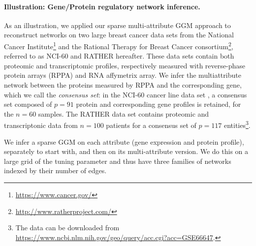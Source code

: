 \paragraph*{Illustration: Gene/Protein regulatory network inference.}

As an illustration, we applied our sparse multi-attribute GGM approach
to reconstruct networks on two large breast cancer data sets from the
National Cancer Institute\footnote{\url{https://www.cancer.gov/}} and
the Rational Therapy for Breast Cancer
consortium\footnote{\url{http://www.ratherproject.com/}}, referred to
as NCI-60 and RATHER hereafter. These data sets contain both proteomic
and transcriptomic profiles, respectively measured with reverse-phase
protein arrays (RPPA) and RNA affymetrix array. We infer the
multiattribute network between the proteins measured by RPPA and the
corresponding gene, which we call the \textit{consensus set}: in the
NCI-60 cancer line data set \citep{pfister2009topoisomerase}, a
consensus set composed of $p=91$ protein and corresponding gene
profiles is retained, for the $n=60$ samples. The RATHER data set
\citep{michaut2016integration} contains proteomic and transcriptonic
data from $n=100$ patients for a consensus set of $p=117$
entities\footnote{The data can be downloaded from
  \url{https://www.ncbi.nlm.nih.gov/geo/query/acc.cgi?acc=GSE66647}.}.

We infer a sparse GGM on each attribute (gene expression and protein
profile), separately to start with, and then on its multi-attribute
version.  We do this on a large grid of the tuning parameter and thus
have three families of networks indexed by their number of edges. 

